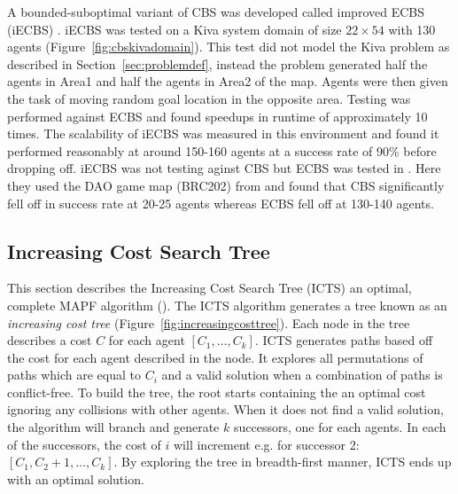\documentclass[a4paper,11pt]{article}
\begin{document}
A bounded-suboptimal variant of CBS was developed called improved ECBS (iECBS) \cite{cohen2016improved}. iECBS was tested on a Kiva system domain of size $22 \times 54$ with 130 agents (Figure~\ref{fig:cbskivadomain}). This test did not model the Kiva problem as described in Section~\ref{sec:problemdef}, instead the problem generated half the agents in Area1 and half the agents in Area2 of the map. Agents were then given the task of moving random goal location in the opposite area. Testing was performed against ECBS and found speedups in runtime of approximately 10 times. The scalability of iECBS was measured in this environment and found it performed reasonably at around 150-160 agents at a success rate of 90\% before dropping off. iECBS was not testing aginst CBS but ECBS was tested in \cite{barer2014suboptimal}. Here they used the DAO game map (BRC202) from \cite{sturtevant2012benchmarks} and found that CBS significantly fell off in success rate at 20-25 agents whereas ECBS fell off at 130-140 agents.



\subsection{Increasing Cost Search Tree}
This section describes the Increasing Cost Search Tree (ICTS) an optimal, complete MAPF algorithm (\cite{sharon2011increasing}). The ICTS algorithm generates a tree known as an \textit{increasing cost tree} (Figure~\ref{fig:increasingcosttree}). Each node in the tree describes a cost $C$ for each agent $[C_1,\dots,C_k]$. ICTS generates paths based off the cost for each agent described in the node. It explores all permutations of paths which are equal to $C_i$ and a valid solution when a combination of paths is conflict-free.  To build the tree, the root starts containing the an optimal cost ignoring any collisions with other agents. When it does not find a valid solution, the algorithm will branch and generate $k$ successors, one for each agents. In each of the successors, the cost of $i$ will increment e.g. for successor 2: $[C_1,C_{2}+1,\dots,C_k]$. By exploring the tree in breadth-first manner, ICTS ends up with an optimal solution.
\end{document}
